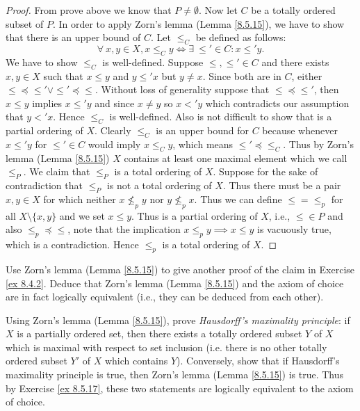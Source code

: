 \begin{proof}
    From prove above we know that \(P \neq \emptyset\).
    Now let \(C\) be a totally ordered subset of \(P\).
    In order to apply Zorn's lemma (Lemma \ref{8.5.15}), we have to show that there is an upper bound of \(C\).
    Let \(\leq_C\) be defined as follows:
    \[
        \forall\ x, y \in X, x \leq_C y \iff \exists\ \leq' \in C : x \leq' y.
    \]
    We have to show \(\leq_C\) is well-defined.
    Suppose \(\leq, \leq' \in C\) and there exists \(x, y \in X\) such that \(x \leq y\) and \(y \leq' x\) but \(y \neq x\).
    Since both are in \(C\), either \(\leq \preceq \leq' \lor \leq' \preceq \leq\).
    Without loss of generality suppose that \(\leq \preceq \leq'\), then \(x \leq y\) implies \(x \leq' y\) and since \(x \neq y\) so \(x <' y\) which contradicts our assumption that \(y <' x\).
    Hence \(\leq_C\) is well-defined.
    Also is not difficult to show that is a partial ordering of \(X\).
    Clearly \(\leq_C\) is an upper bound for \(C\) because whenever \(x \leq' y\) for \(\leq' \in C\) would imply \(x \leq_C y\), which means \(\leq' \preceq \leq_C\).
    Thus by Zorn's lemma (Lemma \ref{8.5.15}) \(X\) contains at least one maximal element which we call \(\leq_P\).
    We claim that \(\leq_P\) is a total ordering of \(X\).
    Suppose for the sake of contradiction that \(\leq_P\) is not a total ordering of \(X\).
    Thus there must be a pair \(x, y \in X\) for which neither \(x \not\leq_p y\) nor \(y \not\leq_p x\).
    Thus we can define \(\leq = \leq_p\) for all \(X \setminus \{x, y\}\) and we set \(x \leq y\).
    Thus is a partial ordering of \(X\), i.e., \(\leq \in P\) and also \(\leq_p \preceq \leq\), note that the implication \(x \leq_p y \implies x \leq y\) is vacuously true, which is a contradiction.
    Hence \(\leq_p\) is a total ordering of \(X\).
\end{proof}

\begin{exercise}\label{ex 8.5.17}
    Use Zorn's lemma (Lemma \ref{8.5.15}) to give another proof of the claim in Exercise \ref{ex 8.4.2}.
    Deduce that Zorn's lemma (Lemma \ref{8.5.15}) and the axiom of choice are in fact logically equivalent
    (i.e., they can be deduced from each other).
\end{exercise}

\begin{exercise}\label{ex 8.5.18}
    Using Zorn's lemma (Lemma \ref{8.5.15}), prove \emph{Hausdorff's maximality principle}:
    if \(X\) is a partially ordered set, then there exists a totally ordered subset \(Y\) of \(X\) which is maximal with respect to set inclusion
    (i.e. there is no other totally ordered subset \(Y'\) of \(X\) which contains \(Y\)).
    Conversely, show that if Hausdorff's maximality principle is true, then Zorn's lemma (Lemma \ref{8.5.15}) is true.
    Thus by Exercise \ref{ex 8.5.17}, these two statements are logically equivalent to the axiom of choice.
\end{exercise}

